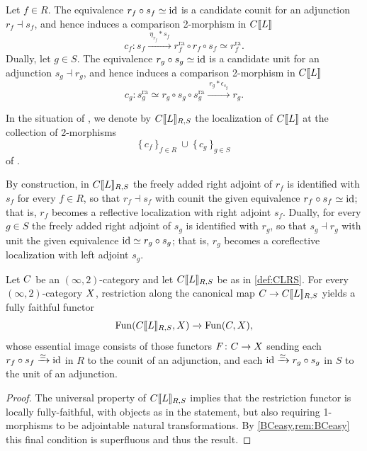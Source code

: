 \documentclass[a4paper,reqno,twoside]{amsart}
\begin{document}
\begin{construction}\label{cons:comparison}
	Let $f \in R$. The equivalence $r_f \circ s_f \simeq \mathrm{id}$ is a candidate counit for an adjunction $r_f \dashv s_f$, and hence induces a comparison 2-morphism in $\relax{C}[\![\relax{L}]\!]$
	\[
		c_f \colon s_f \xrightarrow{\ \eta_{r_f} \ast s_f\ } r_f^{\mathrm{ra}} \circ r_f \circ s_f \simeq r_f^{\mathrm{ra}} .
	\]
	Dually, let $g \in S$. The equivalence $r_g \circ s_g \simeq \mathrm{id}$ is a candidate unit for an adjunction $s_g \dashv r_g$, and hence induces a comparison 2-morphism in $\relax{C}[\![\relax{L}]\!]$
	\[
		c_g \colon s_g^{\mathrm{ra}} \simeq r_g \circ s_g \circ s_g^{\mathrm{ra}} \xrightarrow{\ r_g \ast \epsilon_{s_g}\ } r_g .
	\]
\end{construction}

\begin{definition}\label{def:CLRS}
	In the situation of , we denote by $\relax{C}[\![\relax{L}]\!]_{R,S}$ the localization of $\relax{C}[\![\relax{L}]\!]$ at the collection of 2-morphisms
	\[
		\{\, c_f \,\}_{f \in R} \ \cup \ \{\, c_g \,\}_{g \in S}
	\]
	of .
\end{definition}

\begin{remark}
	By construction, in $\relax{C}[\![\relax{L}]\!]_{R,S}$ the freely added right adjoint of $r_f$ is identified with $s_f$ for every $f \in R$, so that $r_f \dashv s_f$ with counit the given equivalence $r_f \circ s_f \simeq \mathrm{id}$; that is, $r_f$ becomes a reflective localization with right adjoint $s_f$. Dually, for every $g \in S$ the freely added right adjoint of $s_g$ is identified with $r_g$, so that $s_g \dashv r_g$ with unit the given equivalence $\mathrm{id} \simeq r_g \circ s_g$; that is, $r_g$ becomes a coreflective localization with left adjoint $s_g$.
\end{remark}

\begin{theorem}\label{thm:ffaddingsections}
	Let $\relax{C}$ be an $(\infty,2)$-category and let $\relax{C}[\![\relax{L}]\!]_{R,S}$ be as in \cref{def:CLRS}. For every $(\infty,2)$-category $\relax{X}$, restriction along the canonical map $\relax{C} \to \relax{C}[\![\relax{L}]\!]_{R,S}$ yields a fully faithful functor
	\[
		\mathrm{Fun}(\relax{C}[\![\relax{L}]\!]_{R,S},\relax{X}) \xrightarrow{} \mathrm{Fun}(\relax{C},\relax{X}),
	\]
	whose essential image consists of those functors $F \colon \relax{C} \to \relax{X}$ sending each $r_f \circ s_f \xrightarrow{\simeq} \mathrm{id}$ in $R$ to the counit of an adjunction, and each $\mathrm{id} \xrightarrow{\simeq} r_g \circ s_g $ in $S$ to the unit of an adjunction.
\end{theorem}
\begin{proof}
	The universal property of $\relax{C}[\![\relax{L}]\!]_{R,S}$ implies that the restriction functor is locally fully-faithful, with objects as in the statement, but also requiring 1-morphisms to be adjointable natural transformations. By \cref{BCeasy,rem:BCeasy} this final condition is superfluous and thus the result.
\end{proof}
\end{document}
